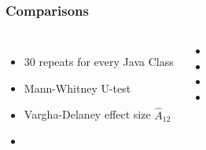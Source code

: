 \begin{frame}
	\frametitle{Comparisons}
	
	\begin{columns}[c]
		
		\blockheading{}
		\begin{itemize}
			\item 30 repeats for every Java Class
			\item Mann-Whitney U-test
			\item Vargha-Delaney effect size $\hat{A}_{12}$
			\item 
		\end{itemize}
		
		\blockheading{}
		\begin{itemize}
			\item 
			\item 
			\item 
			\item 
		\end{itemize}

	\end{columns}
	
\end{frame}

